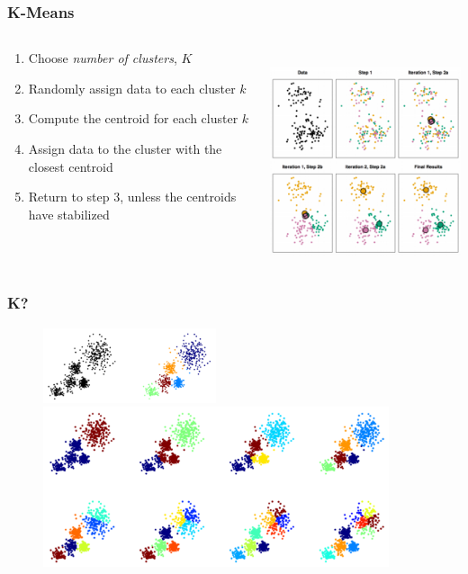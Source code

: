 \documentclass[xcolor={dvipsnames}]{beamer}
\begin{document}
\frame
{
 \frametitle{K-Means}

\vspace{-.5em}
\begin{columns}
\begin{column}{.4\textwidth}
\begin{enumerate}
\item Choose \emph{number of clusters}, $K$
\item Randomly assign data to each cluster $k$
\item Compute the centroid for each cluster $k$
\item Assign data to the cluster with the closest centroid
\item Return to step 3, unless the centroids have stabilized
\end{enumerate}
\end{column}
\begin{column}{.7\textwidth}

${}$\\%
\includegraphics[width=2.85in]{stuffs/kmeans.png}
\end{column}
\end{columns}


}





\frame
{
 \frametitle{K?}

\begin{figure}
\centering
\includegraphics[width=2in]{stuffs/cluster1.png}
\vspace{1.25em}
\includegraphics[width=4in]{stuffs/cluster2.png}
\end{figure}

}
\end{document}

